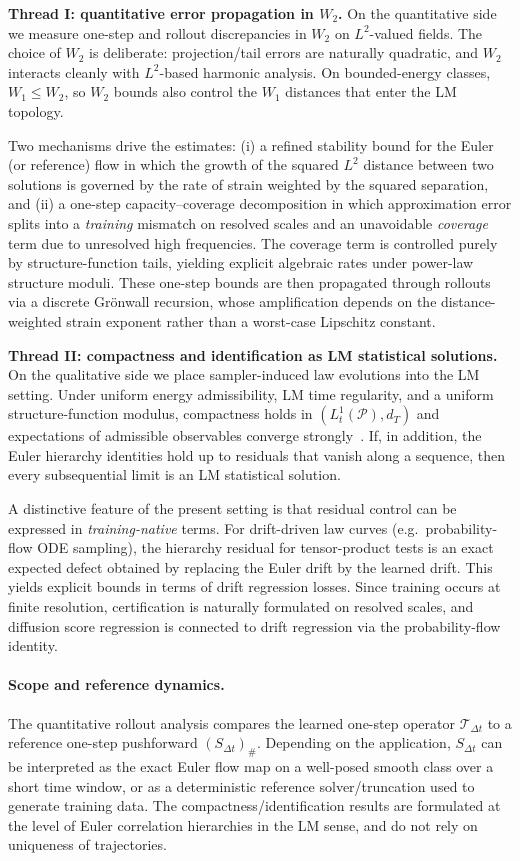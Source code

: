\documentclass{article}
\numberwithin{equation}{section}
\theoremstyle{plain}
\theoremstyle{definition}
\theoremstyle{remark}
\newcommand{\Pcal}{\mathcal{P}}
\begin{document}
\smallskip
\noindent\textbf{Thread I: quantitative error propagation in $W_2$.}
On the quantitative side we measure one-step and rollout discrepancies in $W_2$ on $L^2$-valued fields.
The choice of $W_2$ is deliberate: projection/tail errors are naturally quadratic, and $W_2$ interacts cleanly with
$L^2$-based harmonic analysis. On bounded-energy classes, $W_1\le W_2$, so $W_2$ bounds also control the $W_1$ distances
that enter the LM topology.

Two mechanisms drive the estimates:
(i) a refined stability bound for the Euler (or reference) flow in which the growth of the squared $L^2$ distance between
two solutions is governed by the rate of strain weighted by the squared separation, and (ii) a one-step
capacity--coverage decomposition in which approximation error splits into a \emph{training} mismatch on resolved scales
and an unavoidable \emph{coverage} term due to unresolved high frequencies.
The coverage term is controlled purely by structure-function tails, yielding explicit algebraic rates under power-law
structure moduli.
These one-step bounds are then propagated through rollouts via a discrete Gr\"onwall recursion, whose amplification
depends on the distance-weighted strain exponent rather than a worst-case Lipschitz constant.

\smallskip
\noindent\textbf{Thread II: compactness and identification as LM statistical solutions.}
On the qualitative side we place sampler-induced law evolutions into the LM setting.
Under uniform energy admissibility, LM time regularity, and a uniform structure-function modulus, compactness holds in
$(L^1_t(\Pcal),d_T)$ and expectations of admissible observables converge strongly~\cite{LMP2021}.
If, in addition, the Euler hierarchy identities hold up to residuals that vanish along a sequence, then every
subsequential limit is an LM statistical solution.

A distinctive feature of the present setting is that residual control can be expressed in \emph{training-native} terms.
For drift-driven law curves (e.g.\ probability-flow ODE sampling), the hierarchy residual for tensor-product tests is an
exact expected defect obtained by replacing the Euler drift by the learned drift. This yields explicit bounds in terms of
drift regression losses. Since training occurs at finite resolution, certification is naturally formulated on resolved
scales, and diffusion score regression is connected to drift regression via the probability-flow identity.

\paragraph{Scope and reference dynamics.}
The quantitative rollout analysis compares the learned one-step operator $\mathcal T_{\Delta t}$ to a reference one-step
pushforward $(S_{\Delta t})_\#$.
Depending on the application, $S_{\Delta t}$ can be interpreted as the exact Euler flow map on a well-posed smooth class
over a short time window, or as a deterministic reference solver/truncation used to generate training data.
The compactness/identification results are formulated at the level of Euler correlation hierarchies in the LM sense,
and do not rely on uniqueness of trajectories.
\end{document}
